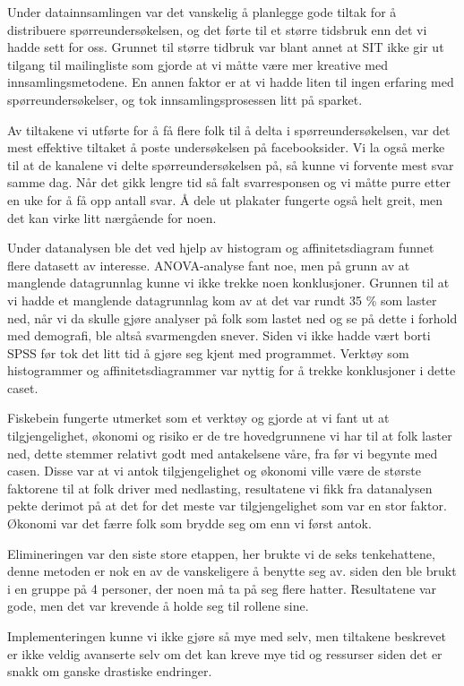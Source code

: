 Under datainnsamlingen var det vanskelig å planlegge gode tiltak for å distribuere spørreundersøkelsen, og det førte til et større tidsbruk enn det vi hadde sett for oss. Grunnet til større tidbruk var blant annet at SIT ikke gir ut tilgang til mailingliste som gjorde at vi måtte være mer kreative med innsamlingsmetodene. En annen faktor er at vi hadde liten til ingen erfaring med spørreundersøkelser, og tok innsamlingsprosessen litt på sparket. 

Av tiltakene vi utførte for å få flere folk til å delta i spørreundersøkelsen, var det mest effektive tiltaket å poste undersøkelsen på facebooksider. Vi la også merke til at de kanalene vi delte spørreundersøkelsen på, så kunne vi forvente mest svar samme dag. Når det gikk lengre tid så falt svarresponsen og vi måtte purre etter en uke for å få opp antall svar. Å dele ut plakater fungerte også helt greit, men det kan virke litt nærgående for noen. 

Under datanalysen ble det ved hjelp av histogram og affinitetsdiagram funnet flere datasett av interesse. ANOVA-analyse fant noe, men på grunn av at manglende datagrunnlag kunne vi ikke trekke noen konklusjoner. Grunnen til at vi hadde et manglende datagrunnlag kom av at det var rundt 35 \% som laster ned, når vi da skulle gjøre analyser på folk som lastet ned og se på dette i forhold med demografi, ble altså svarmengden snever. Siden vi ikke hadde vært borti SPSS før tok det litt tid å gjøre seg kjent med programmet. Verktøy som histogrammer og affinitetsdiagrammer var nyttig for å trekke konklusjoner i dette caset.

Fiskebein fungerte utmerket som et verktøy og gjorde at vi fant ut at tilgjengelighet, økonomi og risiko er de tre hovedgrunnene vi har til at folk laster ned, dette stemmer relativt godt med antakelsene våre, fra før vi begynte med casen. Disse var at vi antok tilgjengelighet og økonomi ville være de største faktorene til at folk driver med nedlasting, resultatene vi fikk fra datanalysen pekte derimot på at det for det meste var tilgjengelighet som var en stor faktor. Økonomi var det færre folk som brydde seg om enn vi først antok. 

Elimineringen var den siste store etappen, her brukte vi de seks tenkehattene, denne metoden er nok en av de vanskeligere å benytte seg av. siden den ble brukt i en gruppe på 4 personer, der noen må ta på seg flere hatter. Resultatene var gode, men det var krevende å holde seg til rollene sine. 

Implementeringen kunne vi ikke gjøre så mye med selv, men tiltakene beskrevet er ikke veldig avanserte selv om det kan kreve mye tid og ressurser siden det er snakk om ganske drastiske endringer. 

